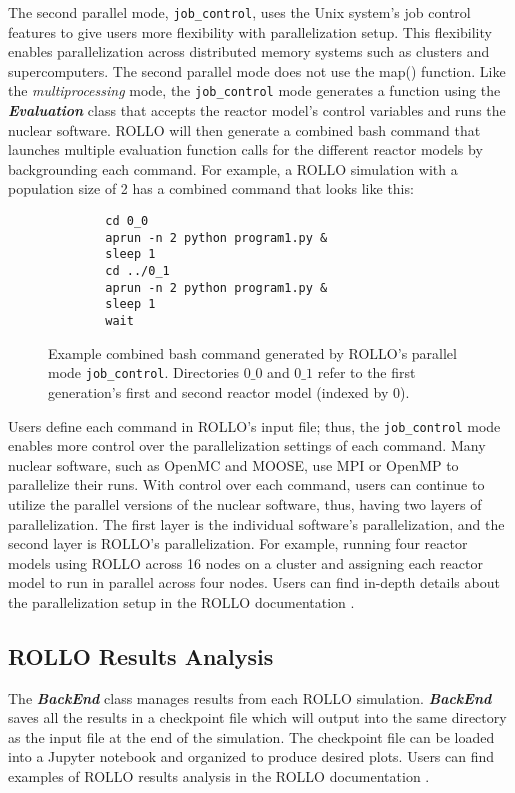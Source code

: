 The second parallel mode, \texttt{job\_control}, uses the Unix system's job control 
features to give users more flexibility with parallelization setup. 
This flexibility enables parallelization across distributed memory systems such as 
clusters and supercomputers. 
The second parallel mode does not use the map() function. 
Like the \textit{multiprocessing} mode, the \texttt{job\_control} mode generates a 
function using the \textbf{\textit{Evaluation}} class that accepts the reactor model's control 
variables and runs the nuclear software. 
\gls{ROLLO} will then generate a combined bash command that launches multiple evaluation 
function calls for the different reactor models by backgrounding each command.
For example, a ROLLO simulation with a population size of 2 has a combined command that
looks like this:
\begin{figure}[H]
    \centering
    \begin{minipage}{0.5\textwidth}
    \begin{verbatim}
        cd 0_0
        aprun -n 2 python program1.py &
        sleep 1 
        cd ../0_1 
        aprun -n 2 python program1.py &
        sleep 1 
        wait
    \end{verbatim}
    \end{minipage}
    \caption{Example combined bash command generated by \gls{ROLLO}'s parallel mode 
    \texttt{job\_control}. Directories $0\_0$ and $0\_1$ refer to the first generation's first 
    and second reactor model (indexed by 0).}
    \label{fig:job-control-example}
\end{figure}
Users define each command in ROLLO's input file; thus, the \texttt{job\_control} mode enables 
more control over the parallelization settings of each command. 
Many nuclear software, such as OpenMC and MOOSE, use \gls{MPI} or OpenMP to parallelize their runs. 
With control over each command, users can continue to utilize the parallel 
versions of the nuclear software, thus, having two layers of parallelization. 
The first layer is the individual software's parallelization, and the second layer is ROLLO's parallelization. 
For example, running four reactor models using ROLLO across 16 nodes on a cluster and assigning each reactor 
model to run in parallel across four nodes. 
Users can find in-depth details about the parallelization setup in the ROLLO documentation
 \cite{chee_documentation_2021}.

\subsection{ROLLO Results Analysis}
The \textbf{\textit{BackEnd}} class manages results from each \gls{ROLLO} simulation. 
\textbf{\textit{BackEnd}} saves all the results in a checkpoint file which will output 
into the same directory as the input file at the end of the simulation. 
The checkpoint file can be loaded into a Jupyter notebook and organized 
to produce desired plots. 
Users can find examples of \gls{ROLLO} results analysis in the \gls{ROLLO} documentation
\cite{chee_documentation_2021}. 

